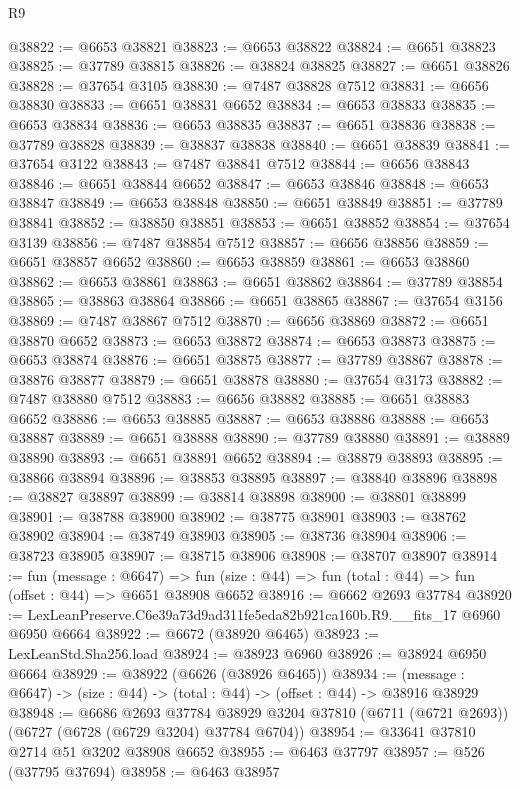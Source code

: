 \begin{lexlean}{R9}
\begin{coremodule}
@38822 := @6653 @38821
@38823 := @6653 @38822
@38824 := @6651 @38823
@38825 := @37789 @38815
@38826 := @38824 @38825
@38827 := @6651 @38826
@38828 := @37654 @3105
@38830 := @7487 @38828 @7512
@38831 := @6656 @38830
@38833 := @6651 @38831 @6652
@38834 := @6653 @38833
@38835 := @6653 @38834
@38836 := @6653 @38835
@38837 := @6651 @38836
@38838 := @37789 @38828
@38839 := @38837 @38838
@38840 := @6651 @38839
@38841 := @37654 @3122
@38843 := @7487 @38841 @7512
@38844 := @6656 @38843
@38846 := @6651 @38844 @6652
@38847 := @6653 @38846
@38848 := @6653 @38847
@38849 := @6653 @38848
@38850 := @6651 @38849
@38851 := @37789 @38841
@38852 := @38850 @38851
@38853 := @6651 @38852
@38854 := @37654 @3139
@38856 := @7487 @38854 @7512
@38857 := @6656 @38856
@38859 := @6651 @38857 @6652
@38860 := @6653 @38859
@38861 := @6653 @38860
@38862 := @6653 @38861
@38863 := @6651 @38862
@38864 := @37789 @38854
@38865 := @38863 @38864
@38866 := @6651 @38865
@38867 := @37654 @3156
@38869 := @7487 @38867 @7512
@38870 := @6656 @38869
@38872 := @6651 @38870 @6652
@38873 := @6653 @38872
@38874 := @6653 @38873
@38875 := @6653 @38874
@38876 := @6651 @38875
@38877 := @37789 @38867
@38878 := @38876 @38877
@38879 := @6651 @38878
@38880 := @37654 @3173
@38882 := @7487 @38880 @7512
@38883 := @6656 @38882
@38885 := @6651 @38883 @6652
@38886 := @6653 @38885
@38887 := @6653 @38886
@38888 := @6653 @38887
@38889 := @6651 @38888
@38890 := @37789 @38880
@38891 := @38889 @38890
@38893 := @6651 @38891 @6652
@38894 := @38879 @38893
@38895 := @38866 @38894
@38896 := @38853 @38895
@38897 := @38840 @38896
@38898 := @38827 @38897
@38899 := @38814 @38898
@38900 := @38801 @38899
@38901 := @38788 @38900
@38902 := @38775 @38901
@38903 := @38762 @38902
@38904 := @38749 @38903
@38905 := @38736 @38904
@38906 := @38723 @38905
@38907 := @38715 @38906
@38908 := @38707 @38907
@38914 := fun (message : @6647) =>
  fun (size : @44) => fun (total : @44) => fun (offset : @44) => @6651 @38908 @6652
@38916 := @6662 @2693 @37784
@38920 := LexLeanPreserve.C6e39a73d9ad311fe5eda82b921ca160b.R9.__fits_17 @6960 @6950 @6664
@38922 := @6672 (@38920 @6465)
@38923 := LexLeanStd.Sha256.load
@38924 := @38923 @6960
@38926 := @38924 @6950 @6664
@38929 := @38922 (@6626 (@38926 @6465))
@38934 := (message : @6647) -> (size : @44) -> (total : @44) -> (offset : @44) -> @38916 @38929
@38948 := @6686
    @2693
    @37784
    @38929
    @3204
    @37810
    (@6711 (@6721 @2693))
    (@6727 (@6728 (@6729 @3204) @37784 @6704))
@38954 := @33641 @37810 @2714 @51 @3202 @38908 @6652
@38955 := @6463 @37797
@38957 := @526 (@37795 @37694)
@38958 := @6463 @38957

\end{coremodule}
\end{lexlean}
